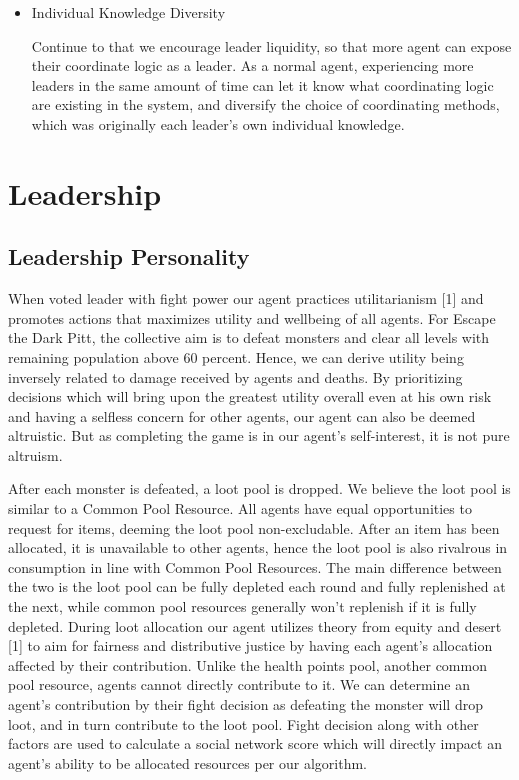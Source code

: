 \begin{itemize}
\begin{flushleft}
            \end{flushleft}
    \item Individual Knowledge Diversity
            \begin{flushleft}
            \setlength{\parindent}{2em}
            Continue to that we encourage leader liquidity, so that more agent can expose their coordinate logic as a leader. As a normal agent, experiencing more leaders in the same amount of time can let it know what coordinating logic are existing in the system, and diversify the choice of coordinating methods, which was originally each leader's own individual knowledge.
            \end{flushleft}
\end{itemize}

\section{Leadership}
\subsection{Leadership Personality}
When voted leader with fight power our agent practices utilitarianism [1] and promotes actions that maximizes utility and wellbeing of all agents. For Escape the Dark Pitt, the collective aim is to defeat monsters and clear all levels with remaining population above 60 percent. Hence, we can derive utility being inversely related to damage received by agents and deaths. By prioritizing decisions which will bring upon the greatest utility overall even at his own risk and having a selfless concern for other agents, our agent can also be deemed altruistic. But as completing the game is in our agent's self-interest, it is not pure altruism.

After each monster is defeated, a loot pool is dropped. We believe the loot pool is similar to a Common Pool Resource. All agents have equal opportunities to request for items, deeming the loot pool non-excludable. After an item has been allocated, it is unavailable to other agents, hence the loot pool is also rivalrous in consumption in line with Common Pool Resources. The main difference between the two is the loot pool can be fully depleted each round and fully replenished at the next, while common pool resources generally won't replenish if it is fully depleted. During loot allocation our agent utilizes theory from equity and desert [1] to aim for fairness and distributive justice by having each agent's allocation affected by their contribution. Unlike the health points pool, another common pool resource, agents cannot directly contribute to it. We can determine an agent's contribution by their fight decision as defeating the monster will drop loot, and in turn contribute to the loot pool. Fight decision along with other factors are used to calculate a social network score which will directly impact an agent's ability to be allocated resources per our algorithm.

